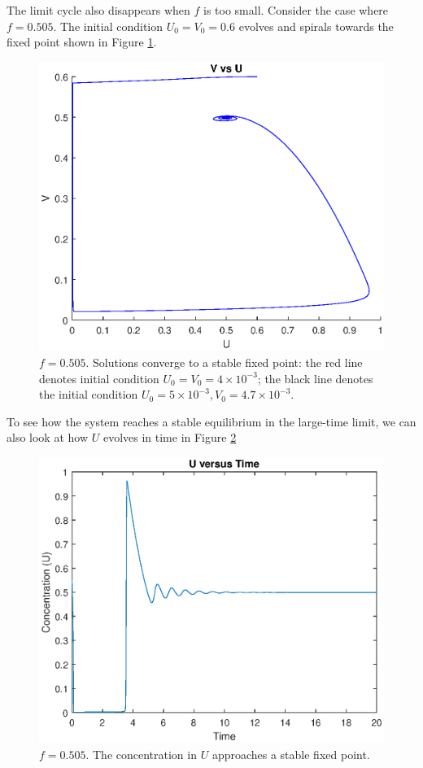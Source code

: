 \documentclass[twocolumn,amsmath,amssymb,aps]{revtex4}
\begin{document}
The limit cycle also disappears when $f$ is too small. Consider the case where $f = 0.505$. The initial condition $U_0 = V_0 = 0.6$ evolves and spirals towards the fixed point shown in Figure \ref{fig:hopf2}.
\begin{figure}[!htb]
	\centering
	\includegraphics[scale=0.48]{hopf2.eps}
	\caption{$f = 0.505$. Solutions converge to a stable fixed point: the red line denotes initial condition $U_0 =V_0 = 4\times 10^{-3}$; the black line denotes the initial condition $U_0 = 5\times 10^{-3}, V_0 = 4.7 \times 10^{-3}$.}
	\label{fig:hopf2}
\end{figure}
To see how the system reaches a stable equilibrium in the large-time limit, we can also look at how $U$ evolves in time in Figure \ref{fig:UEvolves}
\begin{figure}[!htb]
	\centering
	\includegraphics[scale=0.48]{hopf2_time.eps}
	\caption{$f = 0.505$. The concentration in $U$ approaches a stable fixed point.}
	\label{fig:UEvolves}
\end{figure}
\end{document}
